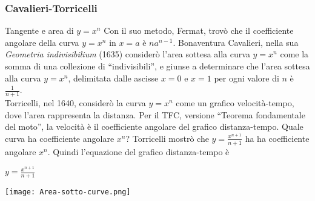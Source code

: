 \begin{frame}[label=Cavalieri-Torricelli]
    \frametitle{Cavalieri-Torricelli}
    \begin{block}{Tangente e area di $y = x^n$}
        Con il suo metodo, Fermat, trovò che il coefficiente angolare della curva $y = x^n$
        in $x=a$ è $na^{n-1}$. Bonaventura Cavalieri, nella sua \textit{Geometria indivisibilium} (1635)
        considerò l'area sottesa alla curva $y= x^n$ come la somma di una collezione di ``indivisibili'',
        e giunse a determinare che l'area sottesa alla curva $y= x^n$, delimitata dalle ascisse
        $x=0$ e $x=1$ per ogni valore di $n$ è $\frac{1}{n+1}$.
        \\
        Torricelli, nel 1640, considerò la curva $y = x^n$ come un grafico velocità-tempo,
        dove l'area rappresenta la distanza.
        Per il \alert{TFC}, versione ``Teorema fondamentale del moto'', la velocità è il 
        coefficiente angolare del grafico distanza-tempo. Quale curva ha coefficiente angolare
        $x^n$?  Torricelli mostrò che $y = \frac{x^{n+1}}{n+1}$ ha ha coefficiente angolare
        $x^n$. Quindi l'equazione del grafico distanza-tempo è 
        \begin{center}
            $y = \frac{x^{n+1}}{n+1}$
        \end{center}
        \begin{center}
        \texttt{[image: Area-sotto-curve.png]}
        \end{center}
    \end{block}
\end{frame}